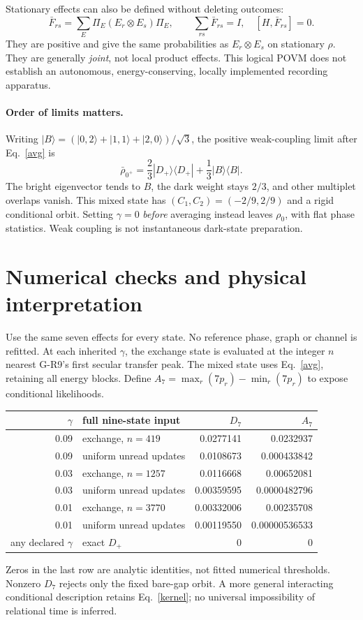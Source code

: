 \documentclass[11pt,a4paper]{article}
\newcommand{\ket}[1]{|#1\rangle}
\newcommand{\bra}[1]{\langle#1|}
\begin{document}
Stationary effects can also be defined without deleting outcomes:
\begin{equation}
 \bar F_{rs}=\sum_E\Pi_E(E_r\otimes E_s)\Pi_E,\qquad
 \sum_{rs}\bar F_{rs}=I,\quad[H,\bar F_{rs}]=0.\label{effects}
\end{equation}
They are positive and give the same probabilities as $E_r\otimes E_s$
on stationary $\rho$. They are generally \emph{joint}, not local
product effects. This logical POVM does not establish an autonomous,
energy-conserving, locally implemented recording apparatus.

\paragraph{Order of limits matters.}
Writing $\ket B=(\ket{0,2}+\ket{1,1}+\ket{2,0})/\sqrt3$, the
positive weak-coupling limit after Eq.~\eqref{avg} is
\begin{equation}
 \bar\rho_{0^+}=\frac23\ket{D_+}\bra{D_+}+\frac13\ket B\bra B.
\end{equation}
The bright eigenvector tends to $B$, the dark weight stays $2/3$,
and other multiplet overlaps vanish. This mixed state has
$(C_1,C_2)=(-2/9,2/9)$ and a rigid conditional orbit. Setting $\gamma=0$
\emph{before} averaging instead leaves $\rho_0$, with flat phase
statistics. Weak coupling is not instantaneous dark-state preparation.

\newpage
\section{Numerical checks and physical interpretation}
Use the same seven effects for every state. No reference phase, graph
or channel is refitted. At each inherited $\gamma$, the exchange state
is evaluated at the integer $n$ nearest G-R9's first secular transfer
peak. The mixed state uses Eq.~\eqref{avg}, retaining all energy blocks.
Define $A_7=\max_r(7p_r)-\min_r(7p_r)$ to expose conditional likelihoods.

\begin{center}
\begin{tabular}{rlrr}\toprule
$\gamma$&full nine-state input&$D_7$&$A_7$\\\midrule
0.09&exchange, $n=419$&0.0277141&0.0232937\\
0.09&uniform unread updates&0.0108673&0.000433842\\
0.03&exchange, $n=1257$&0.0116668&0.00652081\\
0.03&uniform unread updates&0.00359595&0.0000482796\\
0.01&exchange, $n=3770$&0.00332006&0.00235708\\
0.01&uniform unread updates&0.00119550&0.00000536533\\
any declared $\gamma$&exact $D_+$&0&0\\\bottomrule
\end{tabular}
\end{center}
Zeros in the last row are analytic identities, not fitted numerical
thresholds. Nonzero $D_7$ rejects only the fixed bare-gap orbit. A more
general interacting conditional description retains Eq.~\eqref{kernel};
no universal impossibility of relational time is inferred.
\end{document}
